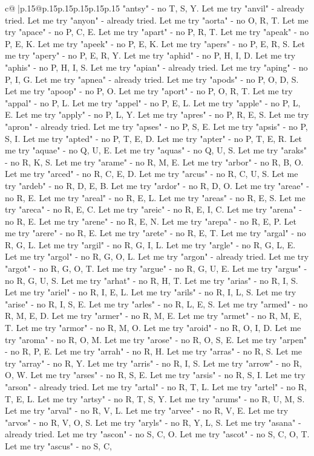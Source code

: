 \documentclass{article}
\begin{document}
{\begin{supertabular}{c@{$\;$}|p{.15\linewidth}@{}p{.15\linewidth}p{.15\linewidth}p{.15\linewidth}p{.15\linewidth}p{.15\linewidth}}
{{{"antsy" {-} no T, S, Y. Let me try "anvil" {-} already tried. Let me try "anyon" {-} already tried. Let me try "aorta" {-} no O, R, T. Let me try "apace" {-} no P, C, E. Let me try "apart" {-} no P, R, T. Let me try "apeak" {-} no P, E, K. Let me try "apeek" {-} no P, E, K. Let me try "apers" {-} no P, E, R, S. Let me try "apery" {-} no P, E, R, Y. Let me try "aphid" {-} no P, H, I, D. Let me try "aphis" {-} no P, H, I, S. Let me try "apian" {-} already tried. Let me try "aping" {-} no P, I, G. Let me try "apnea" {-} already tried. Let me try "apods" {-} no P, O, D, S. Let me try "apoop" {-} no P, O. Let me try "aport" {-} no P, O, R, T. Let me try "appal" {-} no P, L. Let me try "appel" {-} no P, E, L. Let me try "apple" {-} no P, L, E. Let me try "apply" {-} no P, L, Y. Let me try "apres" {-} no P, R, E, S. Let me try "apron" {-} already tried. Let me try "apses" {-} no P, S, E. Let me try "apsis" {-} no P, S, I. Let me try "apted" {-} no P, T, E, D. Let me try "apter" {-} no P, T, E, R. Let me try "aquae" {-} no Q, U, E. Let me try "aquas" {-} no Q, U, S. Let me try "araks" {-} no R, K, S. Let me try "arame" {-} no R, M, E. Let me try "arbor" {-} no R, B, O. Let me try "arced" {-} no R, C, E, D. Let me try "arcus" {-} no R, C, U, S. Let me try "ardeb" {-} no R, D, E, B. Let me try "ardor" {-} no R, D, O. Let me try "areae" {-} no R, E. Let me try "areal" {-} no R, E, L. Let me try "areas" {-} no R, E, S. Let me try "areca" {-} no R, E, C. Let me try "areic" {-} no R, E, I, C. Let me try "arena" {-} no R, E. Let me try "arene" {-} no R, E, N. Let me try "arepa" {-} no R, E, P. Let me try "arere" {-} no R, E. Let me try "arete" {-} no R, E, T. Let me try "argal" {-} no R, G, L. Let me try "argil" {-} no R, G, I, L. Let me try "argle" {-} no R, G, L, E. Let me try "argol" {-} no R, G, O, L. Let me try "argon" {-} already tried. Let me try "argot" {-} no R, G, O, T. Let me try "argue" {-} no R, G, U, E. Let me try "argus" {-} no R, G, U, S. Let me try "arhat" {-} no R, H, T. Let me try "arias" {-} no R, I, S. Let me try "ariel" {-} no R, I, E, L. Let me try "arils" {-} no R, I, L, S. Let me try "arise" {-} no R, I, S, E. Let me try "arles" {-} no R, L, E, S. Let me try "armed" {-} no R, M, E, D. Let me try "armer" {-} no R, M, E. Let me try "armet" {-} no R, M, E, T. Let me try "armor" {-} no R, M, O. Let me try "aroid" {-} no R, O, I, D. Let me try "aroma" {-} no R, O, M. Let me try "arose" {-} no R, O, S, E. Let me try "arpen" {-} no R, P, E. Let me try "arrah" {-} no R, H. Let me try "arras" {-} no R, S. Let me try "array" {-} no R, Y. Let me try "arris" {-} no R, I, S. Let me try "arrow" {-} no R, O, W. Let me try "arses" {-} no R, S, E. Let me try "arsis" {-} no R, S, I. Let me try "arson" {-} already tried. Let me try "artal" {-} no R, T, L. Let me try "artel" {-} no R, T, E, L. Let me try "artsy" {-} no R, T, S, Y. Let me try "arums" {-} no R, U, M, S. Let me try "arval" {-} no R, V, L. Let me try "arvee" {-} no R, V, E. Let me try "arvos" {-} no R, V, O, S. Let me try "aryls" {-} no R, Y, L, S. Let me try "asana" {-} already tried. Let me try "ascon" {-} no S, C, O. Let me try "ascot" {-} no S, C, O, T. Let me try "ascus" {-} no S, C, }}}
\end{supertabular}}
\end{document}
